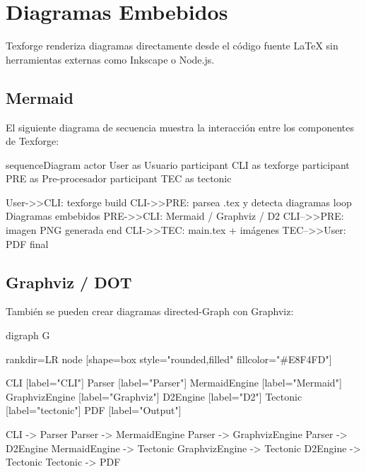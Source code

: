 \documentclass[a4paper,12pt]{article}
\begin{document}
  \section{Diagramas Embebidos}\label{sec:diagramas}

  Texforge renderiza diagramas directamente desde el código fuente LaTeX
  sin herramientas externas como Inkscape o Node.js.

  \subsection{Mermaid}

  El siguiente diagrama de secuencia muestra la interacción entre los
  componentes de Texforge:

  \begin{mermaid}[caption=Secuencia de compilación de Texforge, height=10cm, pos=t]
    sequenceDiagram
    actor User as Usuario
    participant CLI as texforge
    participant PRE as Pre-procesador
    participant TEC as tectonic

    User->>CLI: texforge build
    CLI->>PRE: parsea .tex y detecta diagramas
    loop Diagramas embebidos
    PRE->>CLI: Mermaid / Graphviz / D2
    CLI-->>PRE: imagen PNG generada
    end
    CLI->>TEC: main.tex + imágenes
    TEC-->>User: PDF final
  \end{mermaid}

  \subsection{Graphviz / DOT}

  También se pueden crear diagramas directed-Graph con Graphviz:

  \begin{graphviz}[caption=Arquitectura de Texforge, width=0.8\linewidth, pos=t]
    digraph G {
      rankdir=LR
      node [shape=box style="rounded,filled" fillcolor="#E8F4FD"]

      CLI [label="CLI\ntexforge"]
      Parser [label="Parser\nLaTeX"]
      MermaidEngine [label="Mermaid\nRenderer"]
      GraphvizEngine [label="Graphviz\nRenderer"]
      D2Engine [label="D2\nRenderer"]
      Tectonic [label="tectonic\nEngine"]
      PDF [label="Output\nPDF"]

      CLI -> Parser
      Parser -> MermaidEngine
      Parser -> GraphvizEngine
      Parser -> D2Engine
      MermaidEngine -> Tectonic
      GraphvizEngine -> Tectonic
      D2Engine -> Tectonic
      Tectonic -> PDF
    }
  \end{graphviz}
\end{document}

